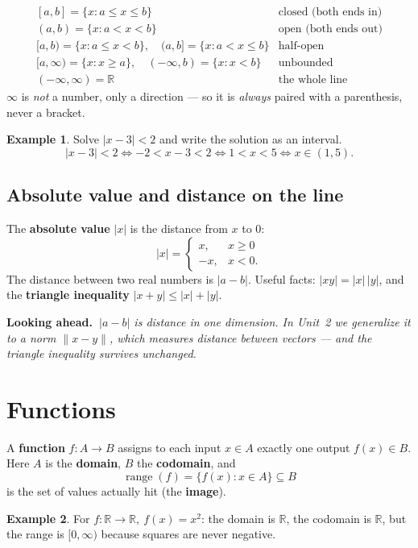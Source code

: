 \documentclass[11pt]{article}
\theoremstyle{definition}
\newtheorem{example}{Example}[section]
\newcommand{\lookahead}[1]{%
  \par\smallskip\noindent
  {\sffamily\bfseries\color{BrickRed}Looking ahead.~}\textit{#1}\par\smallskip}
\newcommand{\R}{\mathbb{R}}
\begin{document}
\[
\begin{array}{ll}
[a,b]=\{x:a\le x\le b\} & \text{closed (both ends in)}\\
(a,b)=\{x:a<x<b\} & \text{open (both ends out)}\\
{[a,b)}=\{x:a\le x<b\},\quad (a,b]=\{x:a<x\le b\} & \text{half-open}\\
{[a,\infty)}=\{x:x\ge a\},\quad (-\infty,b)=\{x:x<b\} & \text{unbounded}\\
(-\infty,\infty)=\R & \text{the whole line}
\end{array}
\]
$\infty$ is \emph{not} a number, only a direction --- so it is \emph{always} paired
with a parenthesis, never a bracket.

\begin{example}
Solve $|x-3|<2$ and write the solution as an interval.
\[
|x-3|<2 \iff -2<x-3<2 \iff 1<x<5 \iff x\in(1,5).
\]
\end{example}

\subsection{Absolute value and distance on the line}
The \textbf{absolute value} $|x|$ is the distance from $x$ to $0$:
\[
|x|=\begin{cases} x, & x\ge 0\\ -x, & x<0.\end{cases}
\]
The distance between two real numbers is $|a-b|$. Useful facts:
$|xy|=|x|\,|y|$, and the \textbf{triangle inequality} $|x+y|\le|x|+|y|$.

\lookahead{$|a-b|$ is distance in one dimension. In Unit~2 we generalize it to a
\emph{norm} $\|x-y\|$, which measures distance between vectors --- and the
triangle inequality survives unchanged.}

\section{Functions}
A \textbf{function} $f:A\to B$ assigns to each input $x\in A$ exactly one output
$f(x)\in B$. Here $A$ is the \textbf{domain}, $B$ the \textbf{codomain}, and
\[
\operatorname{range}(f)=\{f(x): x\in A\}\subseteq B
\]
is the set of values actually hit (the \textbf{image}).

\begin{example}
For $f:\R\to\R,\ f(x)=x^2$: the domain is $\R$, the codomain is $\R$, but the
range is $[0,\infty)$ because squares are never negative.
\end{example}
\end{document}
